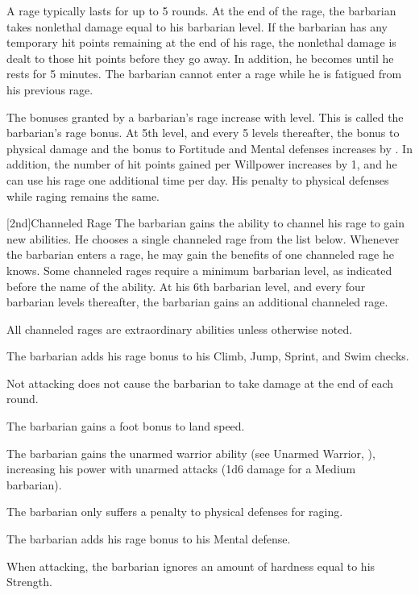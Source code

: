 A rage typically lasts for up to 5 rounds.
At the end of the rage, the barbarian takes nonlethal damage equal to his barbarian level.
If the barbarian has any temporary hit points remaining at the end of his rage, the nonlethal damage is dealt to those hit points before they go away.
In addition, he becomes \fatigued until he rests for 5 minutes.
The barbarian cannot enter a rage while he is fatigued from his previous rage.

The bonuses granted by a barbarian's rage increase with level.
This is called the barbarian's rage bonus.
At 5th level, and every 5 levels thereafter, the bonus to physical damage and the bonus to Fortitude and Mental defenses increases by .
In addition, the number of hit points gained per Willpower increases by 1, and he can use his rage one additional time per day.
His penalty to physical defenses while raging remains the same.

[2nd]{Channeled Rage}
The barbarian gains the ability to channel his rage to gain new abilities.
He chooses a single channeled rage from the list below.
Whenever the barbarian enters a rage, he may gain the benefits of one channeled rage he knows.
Some channeled rages require a minimum barbarian level, as indicated before the name of the ability.
At his 6th barbarian level, and every four barbarian levels thereafter, the barbarian gains an additional channeled rage.

All channeled rages are extraordinary abilities unless otherwise noted.

The barbarian adds his rage bonus to his Climb, Jump, Sprint, and Swim checks.

Not attacking does not cause the barbarian to take damage at the end of each round.

The barbarian gains a  foot bonus to land speed.

The barbarian gains the unarmed warrior ability (see Unarmed Warrior, ), increasing his power with unarmed attacks (1d6 damage for a Medium barbarian).

The barbarian only suffers a  penalty to physical defenses for raging.

The barbarian adds his rage bonus to his Mental defense.

When attacking, the barbarian ignores an amount of hardness equal to his Strength.

